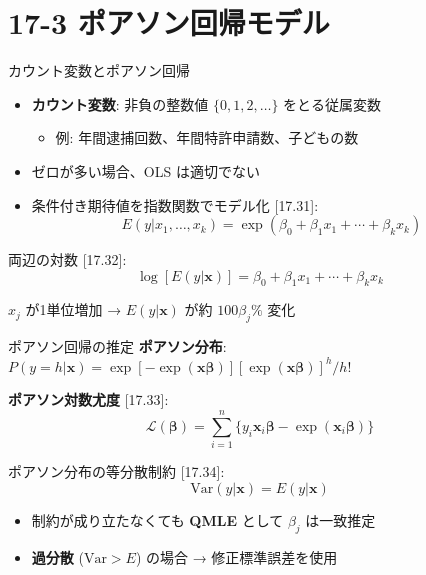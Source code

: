 \documentclass[
  ignorenonframetext,
]{beamer}
\providecommand{\tightlist}{%
  \setlength{\itemsep}{0pt}\setlength{\parskip}{0pt}}
\begin{document}
\hypertarget{ux30ddux30a2ux30bdux30f3ux56deux5e30ux30e2ux30c7ux30eb}{%
\section{17-3
ポアソン回帰モデル}\label{ux30ddux30a2ux30bdux30f3ux56deux5e30ux30e2ux30c7ux30eb}}

\begin{frame}{カウント変数とポアソン回帰}
\protect\hypertarget{ux30abux30a6ux30f3ux30c8ux5909ux6570ux3068ux30ddux30a2ux30bdux30f3ux56deux5e30}{}
\begin{itemize}
\item
  \textbf{カウント変数}: 非負の整数値 \(\{0, 1, 2, \ldots\}\)
  をとる従属変数

  \begin{itemize}
  \tightlist
  \item
    例: 年間逮捕回数、年間特許申請数、子どもの数
  \end{itemize}
\item
  ゼロが多い場合、OLS は適切でない
\item
  条件付き期待値を指数関数でモデル化 {[}17.31{]}:
  \[E(y|x_1, \ldots, x_k) = \exp(\beta_0 + \beta_1 x_1 + \cdots + \beta_k x_k)\]
\end{itemize}

両辺の対数 {[}17.32{]}:
\[\log[E(y|\mathbf{x})] = \beta_0 + \beta_1 x_1 + \cdots + \beta_k x_k\]

\(x_j\) が1単位増加 → \(E(y|\mathbf{x})\) が約 \(100\beta_j\%\) 変化
\end{frame}

\begin{frame}{ポアソン回帰の推定}
\protect\hypertarget{ux30ddux30a2ux30bdux30f3ux56deux5e30ux306eux63a8ux5b9a}{}
\textbf{ポアソン分布}:
\(P(y = h|\mathbf{x}) = \exp[-\exp(\mathbf{x\beta})][\exp(\mathbf{x\beta})]^h/h!\)

\textbf{ポアソン対数尤度} {[}17.33{]}:
\[\mathcal{L}(\boldsymbol{\beta}) = \sum_{i=1}^n \{y_i \mathbf{x}_i\boldsymbol{\beta} - \exp(\mathbf{x}_i\boldsymbol{\beta})\}\]

ポアソン分布の等分散制約 {[}17.34{]}:
\[\text{Var}(y|\mathbf{x}) = E(y|\mathbf{x})\]

\begin{itemize}
\tightlist
\item
  制約が成り立たなくても \textbf{QMLE} として \(\beta_j\) は一致推定
\item
  \textbf{過分散} (\(\text{Var} > E\)) の場合 → 修正標準誤差を使用
\end{itemize}
\end{frame}
\end{document}
